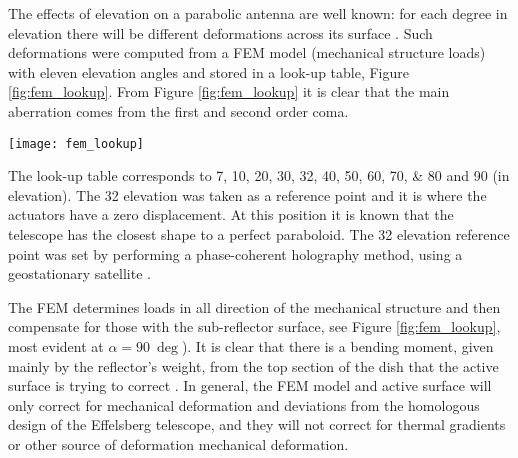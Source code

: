 \documentclass[
    ]
    {aa}
\begin{document}
\begin{appendix}
        The effects of elevation on a parabolic antenna are well known: for each degree in elevation there will be different deformations across its surface \citep{2018ASSL..447.....B}. Such deformations were computed from a FEM model (mechanical structure loads) with eleven elevation angles and stored in a look-up table, Figure \ref{fig:fem_lookup}. From Figure \ref{fig:fem_lookup} it is clear that the main aberration comes from the first and second order coma.

        \begin{figure*}
            \centering
            \texttt{[image: fem\_lookup]}
            \caption{Active surface control system look-up table. There are eleven elevation angles in the look-up table, ${\varphi_\bot}_\text{FEM}$, with the \SI{32}{\deg} set to zero displacements. Each panel shows the elevation angle, $\alpha$, and its rms value in microns, $\delta_\text{rms}$. The contour lines are between \SIlist{-2000;2000}{\micro\m}, with \SI{400}{\micro\m} intervals. The actuators maximum displacement is of $\SI{\pm5}{\mm}$. It is instantly noticeable stronger corrections for an angle closer to \SI{90}{\deg}. The dominant aberrations are first and second coma.}
            \label{fig:fem_lookup}
        \end{figure*}

        The look-up table corresponds to \numlist[list-final-separator={, }]{7;10;20;30;32;40;50;60;70;80} and \SI{90}{\deg} (in elevation).
        The \SI{32}{\deg} elevation was taken as a reference point and it is where the actuators have a zero displacement. At this position it is known that the telescope has the closest shape to a perfect paraboloid. The \SI{32}{\deg} elevation reference point was set by performing a phase-coherent holography method, using a geostationary satellite \citep{kesteveen2001effelsberg}.

        The FEM determines loads in all direction of the mechanical structure and then compensate for those with the sub-reflector surface, see Figure \ref{fig:fem_lookup}, most evident at $\alpha=\SI{90}{\deg}$). It is clear that there is a bending moment, given mainly by the reflector's weight, from the top section of the dish that the active surface is trying to correct \citep[see][Chapter~4.5.3]{2018ASSL..447.....B}.
        In general, the FEM model and active surface will only correct for mechanical deformation and deviations from the homologous design of the Effelsberg telescope, and they will not correct for thermal gradients or other source of deformation mechanical deformation.

    \end{appendix}
\end{document}
